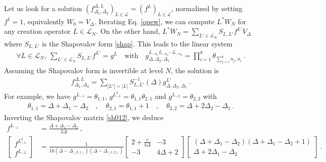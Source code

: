 \documentclass[12pt, a4paper]{article}
\begin{document}
Let us look for a solution $\left(f^{\Delta,L}_{\Delta_1,\Delta_2}\right)_{L\in\mathcal{L}}=\left(f^L\right)_{L\in\mathcal{L}}$, normalized by setting $f^{1}=1$, equivalently $W_0 = V_\Delta$. Iterating Eq. \eqref{opew}, we can compute $L^*W_N$ for any creation operator $L\in\mathcal{L}_N$. On the other hand, $L^*W_N = \sum_{L'\in\mathcal{L}_N} S_{L,L'} f^{L'}V_\Delta$ where $S_{L,L'}$ is the Shapovalov form \eqref{shap}.
This leads to the linear system 
\begin{align}
 \forall L\in \mathcal{L}_N, \ \sum_{L'\in\mathcal{L}_N} S_{L,L'} f^{L'} = g^L \quad \text{with} \quad 
 g^{L_{-n_1}L_{-n_2}\cdots L_{-n_k}}_{\Delta,\Delta_2,\Delta_1} = \prod_{i=1}^k \theta_{\sum_{j=i}^k n_j, n_i}
 \ .
 \label{sgl}
\end{align}
Assuming the Shapovalov form is invertible at level $N$, the solution is 
\begin{align}
 \boxed{f^{\Delta,L}_{\Delta_1,\Delta_2} = \sum_{|L'|=|L|} S_{L,L'}^{-1}(\Delta) g^{L'}_{\Delta,\Delta_2,\Delta_1}}\ .
 \label{fsg}
\end{align}
For example, we have $g^{L_{-1}} = \theta_{1,1}$, $g^{L_{-1}^2} = \theta_{1,1}\theta_{2,1}$ and $g^{L_{-2}}=\theta_{2,2}$ with 
\begin{align}
 \theta_{1,1} = \Delta+\Delta_1-\Delta_2 \quad , \quad \theta_{2,1} = \theta_{1,1}+1 \quad , \quad \theta_{2,2} = \Delta+2\Delta_2-\Delta_1 \ .
\end{align}
Inverting the Shapovalov matrix \eqref{sh012}, we deduce
\begin{subequations}
 \label{fl12}
 \begin{align}
  f^{L_{-1}} & = \frac{\Delta+\Delta_1-\Delta_2}{2\Delta}\ ,
  \label{fl1}
  \\
  \left[\begin{smallmatrix}
 f^{L_{-1}^2} \\ f^{L_{-2}} 
 \end{smallmatrix}\right] 
 & =
   \frac{1}{16(\Delta-\Delta_{(2,1)})(\Delta-\Delta_{(1,2)})}
\left[\begin{smallmatrix} 2+\frac{c}{4\Delta} & -3 \\ -3 & 4\Delta+2 \end{smallmatrix}\right]
\left[\begin{smallmatrix} (\Delta+\Delta_1-\Delta_2)(\Delta+\Delta_1-\Delta_2+1) \\ \Delta+2\Delta_1-\Delta_2 \end{smallmatrix}\right] \ .
 \end{align}
\end{subequations}
\end{document}
